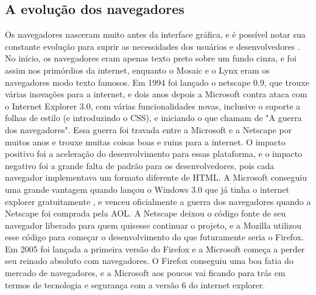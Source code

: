 
\subsection{A evolução dos navegadores}

Os navegadores nasceram muito antes da interface gráfica,
e é possível notar sua constante evolução para suprir as necessidades
dos usuários e desenvolvedores \cite{robbins2006web}. No início, os
navegadores eram apenas texto preto sobre um fundo cinza, e foi assim
nos primórdios da internet, enquanto o Mosaic e o Lynx eram os
navegadores modo texto famosos. Em 1994 foi lançado o netscape 0.9, que
trouxe várias inovações para a internet, e dois anos depois a
Microsoft contra ataca com o Internet Explorer 3.0, com várias
funcionalidades novas, inclusive o suporte a folhas de estilo (e
introduzindo o CSS), e iniciando o que chamam de "A guerra dos
navegadores". Essa guerra foi travada entre a Microsoft e a Netscape
por muitos anos e trouxe muitas coisas boas e ruins para a internet. O
impacto positivo foi a aceleração do desenvolvimento para essas
plataforma, e o impacto negativo foi a grande falta de padrão para os
desenvolvedores, pois cada navegador implementava um formato diferente
de HTML. A Microsoft conseguiu uma grande vantagem quando lançou
o Windows 3.0 que já tinha o internet explorer gratuitamente
\cite{asleson2006foundations}, e venceu oficialmente a guerra dos navegadores quando a
Netscape foi comprada pela AOL. A Netscape deixou o código fonte
de seu navegador liberado para quem quisesse continuar o projeto,
e a Mozilla utilizou esse código para começar o desenvolvimento
do que futuramente seria o Firefox.
Em 2005 foi lançada a primeira versão do Firefox e a Microsoft começa
a perder seu reinado absoluto com navegadores. O Firefox conseguiu uma
boa fatia do mercado de navegadores, e a Microsoft aos poucos vai
ficando para trás em termos de tecnologia e segurança com a versão 6
do internet explorer.

